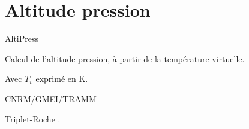 %
\section{Altitude pression}

 {\sf AltiPress}

Calcul de l'altitude pression, \`a 
partir de la temp\'erature virtuelle.

\bigskip





Avec $T_v$ exprim\'e en K.

CNRM/GMEI/TRAMM

Triplet-Roche \cite{Triplet-Roche}.
